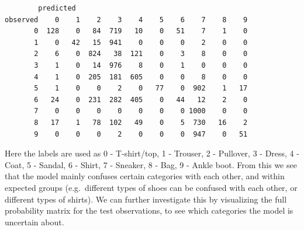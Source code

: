 \documentclass[
  letterpaper,
]{krantz}
\begin{document}
\begin{verbatim}
        predicted
observed    0    1    2    3    4    5    6    7    8    9
       0  128    0   84  719   10    0   51    7    1    0
       1    0   42   15  941    0    0    0    2    0    0
       2    6    0  824   38  121    0    3    8    0    0
       3    1    0   14  976    8    0    1    0    0    0
       4    1    0  205  181  605    0    0    8    0    0
       5    1    0    0    2    0   77    0  902    1   17
       6   24    0  231  282  405    0   44   12    2    0
       7    0    0    0    0    0    0    0 1000    0    0
       8   17    1   78  102   49    0    5  730   16    2
       9    0    0    0    2    0    0    0  947    0   51
\end{verbatim}

Here the labels are used as 0 - T-shirt/top, 1 - Trouser, 2 - Pullover,
3 - Dress, 4 - Coat, 5 - Sandal, 6 - Shirt, 7 - Sneaker, 8 - Bag, 9 -
Ankle boot. From this we see that the model mainly confuses certain
categories with each other, and within expected groups (e.g.~different
types of shoes can be confused with each other, or different types of
shirts). We can further investigate this by visualizing the full
probability matrix for the test observations, to see which categories
the model is uncertain about.
\end{document}
